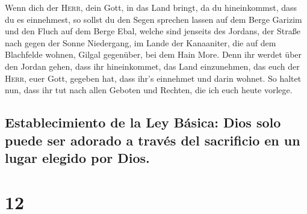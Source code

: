 Wenn dich der \textsc{Herr}, dein Gott, in das Land
bringt, da du hineinkommst, dass du es einnehmest, so sollst du den
Segen sprechen lassen auf dem Berge Garizim und den Fluch auf dem Berge
Ebal,  welche sind jenseits des Jordans, der Straße nach
gegen der Sonne Niedergang, im Lande der Kanaaniter, die auf dem
Blachfelde wohnen, Gilgal gegenüber, bei dem Hain More. 
Denn ihr werdet über den Jordan gehen, dass ihr hineinkommet, das Land
einzunehmen, das euch der \textsc{Herr}, euer Gott, gegeben hat, dass
ihr's einnehmet und darin wohnet.  So haltet nun, dass
ihr tut nach allen Geboten und Rechten, die ich euch heute vorlege.

\hypertarget{establecimiento-de-la-ley-buxe1sica-dios-solo-puede-ser-adorado-a-travuxe9s-del-sacrificio-en-un-lugar-elegido-por-dios.}{%
\subsection{Establecimiento de la Ley Básica: Dios solo puede ser
adorado a través del sacrificio en un lugar elegido por
Dios.}\label{establecimiento-de-la-ley-buxe1sica-dios-solo-puede-ser-adorado-a-travuxe9s-del-sacrificio-en-un-lugar-elegido-por-dios.}}

\hypertarget{section-11}{%
\section{12}\label{section-11}}

